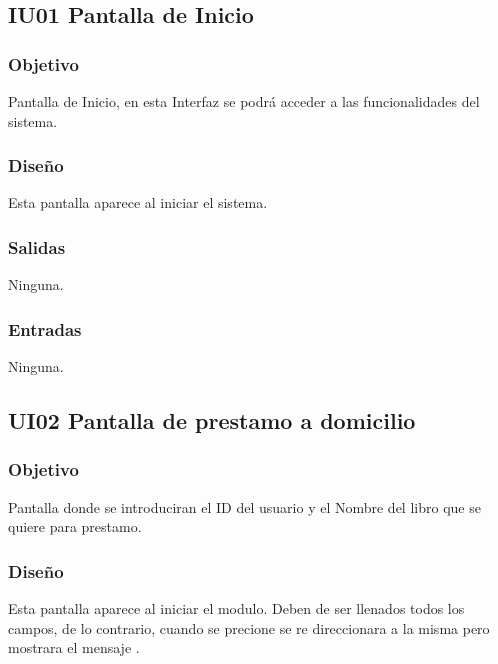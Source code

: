\newpage
\subsection{IU01 Pantalla de Inicio}

\subsubsection{Objetivo}
	Pantalla de Inicio, en esta Interfaz se podrá acceder a las funcionalidades del sistema.  

\subsubsection{Diseño}
	Esta pantalla aparece al iniciar el sistema.  


\subsubsection{Salidas}
	\begin{Citemize}
		\item Ninguna. 
	\end{Citemize}
	
\subsubsection{Entradas}
	\begin{Citemize}
		\item Ninguna.
	\end{Citemize}







\newpage
\subsection{UI02 Pantalla de prestamo a domicilio}

\subsubsection{Objetivo}
	Pantalla donde se introduciran el ID del usuario y el Nombre del libro que se quiere para prestamo.

\subsubsection{Diseño}
	Esta pantalla aparece al iniciar el modulo. Deben de ser llenados todos los campos, de lo contrario, cuando se precione   se re direccionara a la misma pero mostrara el mensaje .

